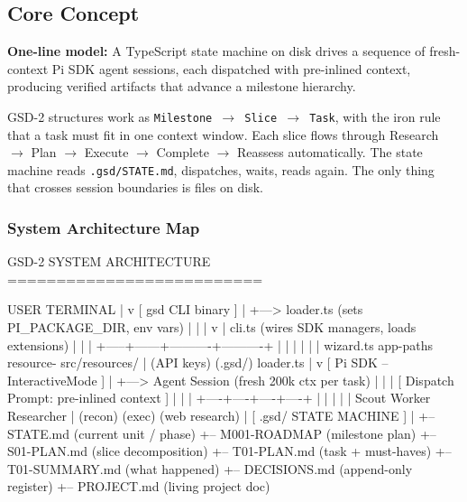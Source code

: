 \documentclass[11pt,letterpaper]{article}
\begin{document}
\subsection{Core Concept}

\textbf{One-line model:} A TypeScript state machine on disk drives a sequence of fresh-context Pi SDK agent sessions, each dispatched with pre-inlined context, producing verified artifacts that advance a milestone hierarchy.

GSD-2 structures work as \texttt{Milestone $\rightarrow$ Slice $\rightarrow$ Task}, with the iron rule that a task must fit in one context window. Each slice flows through Research $\rightarrow$ Plan $\rightarrow$ Execute $\rightarrow$ Complete $\rightarrow$ Reassess automatically. The state machine reads \texttt{.gsd/STATE.md}, dispatches, waits, reads again. The only thing that crosses session boundaries is files on disk.

\subsubsection{System Architecture Map}

\begin{asciibox}
GSD-2 SYSTEM ARCHITECTURE
==========================

  USER TERMINAL
       |
       v
  [ gsd CLI binary ]
       |
       +---> loader.ts  (sets PI_PACKAGE_DIR, env vars)
       |          |
       |          v
       |     cli.ts  (wires SDK managers, loads extensions)
       |          |
       |    +-----+------+----------+----------+
       |    |            |          |          |
       |  wizard.ts  app-paths  resource-   src/resources/
       |  (API keys)   (.gsd/)   loader.ts
       |
       v
  [ Pi SDK -- InteractiveMode ]
       |
       +---> Agent Session (fresh 200k ctx per task)
       |         |
       |    [ Dispatch Prompt: pre-inlined context ]
       |         |
       |    +----+----+----+----+
       |    |         |        |
       |  Scout   Worker  Researcher
       |  (recon) (exec)  (web research)
       |
  [ .gsd/ STATE MACHINE ]
       |
       +-- STATE.md       (current unit / phase)
       +-- M001-ROADMAP   (milestone plan)
       +-- S01-PLAN.md    (slice decomposition)
       +-- T01-PLAN.md    (task + must-haves)
       +-- T01-SUMMARY.md (what happened)
       +-- DECISIONS.md   (append-only register)
       +-- PROJECT.md     (living project doc)
\end{asciibox}
\end{document}
